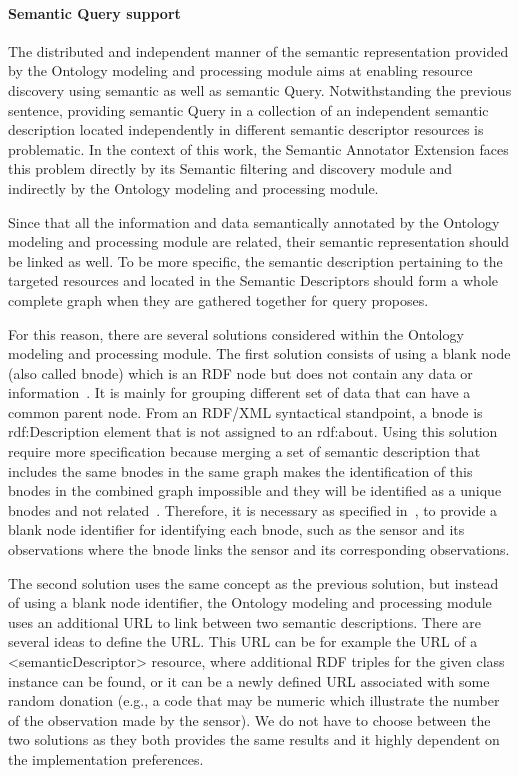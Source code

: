 \paragraph{Semantic Query support }
\label{sec:contrib2:onq}
The distributed and independent manner of the semantic representation provided by the Ontology modeling and processing module aims at enabling resource discovery using semantic as well as semantic Query. Notwithstanding the previous sentence, providing semantic Query in a collection of an independent semantic description located independently in different semantic descriptor resources is problematic. In the context of this work, the Semantic Annotator Extension faces this problem directly by its Semantic filtering and discovery module and indirectly by the Ontology modeling and processing module. \par
Since that all the information and data semantically annotated by the Ontology modeling and processing module are related, their semantic representation should be linked as well. To be more specific, the semantic description pertaining to the targeted resources and located in the Semantic Descriptors should form a whole complete graph when they are gathered together for query proposes. \par
For this reason, there are several solutions considered within the Ontology modeling and processing module. The first solution consists of using a blank node (also called bnode) which is an RDF node but does not contain any data or information~\cite{bnode}. It is mainly for grouping different set of data that can have a common parent node. From an RDF/XML syntactical standpoint, a bnode is rdf:Description element that is not assigned to an rdf:about. Using this solution require more specification because merging a set of semantic description that includes the same bnodes in the same graph makes the identification of this bnodes in the combined graph impossible and they will be identified as a unique bnodes and not related~\cite{w3crdf}. Therefore, it is necessary as specified in~\cite{bnode}, to provide a blank node identifier for identifying each bnode, such as the sensor and its observations where the bnode links the sensor and its corresponding observations. \par
The second solution uses the same concept as the previous solution, but instead of using a blank node identifier, the Ontology modeling and processing module uses an additional URL to link between two semantic descriptions. There are several ideas to define the URL. This URL can be for example the URL of a <semanticDescriptor> resource, where additional RDF triples for the given class instance can be found, or it can be a newly defined URL associated with some random donation (e.g., a code that may be numeric which illustrate the number of the observation made by the sensor). We do not have to choose between the two solutions as they both provides the same results and it highly dependent on the implementation preferences. 

